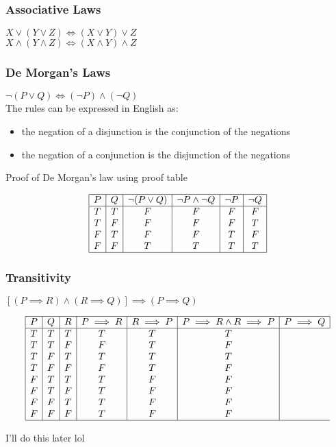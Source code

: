 \documentclass[a4paper]{article}
\begin{document}
\subsubsection{Associative Laws}
$X \lor (Y \lor Z) \Leftrightarrow (X \lor Y) \lor Z $\\
$X \land (Y \land Z) \Leftrightarrow (X \land Y) \land Z $

\subsubsection{De Morgan's Laws}
$\lnot (P \lor Q) \Leftrightarrow (\lnot P) \land (\lnot Q)$
\\
The rules can be expressed in English as:
\begin{itemize}
	\item the negation of a disjunction is the conjunction of the negations
	\item the negation of a conjunction is the disjunction of the negations
\end{itemize}
Proof of De Morgan's law using proof table
\begin{center}
	\begin{displaymath}
		\begin{array}{|c|c|c|c|c|c|c|}
			\hline
			P & Q & \lnot (P \lor Q) & \lnot P \land \lnot Q & \lnot P & \lnot Q\\ 
			\hline
			T & T & F & F & F & F\\
			T & F & F & F & F & T\\
			F & T & F & F & T & F\\
			F & F & T & T & T & T\\
			\hline
		\end{array}
	\end{displaymath}
\end{center}

\subsubsection{Transitivity}
$[(P \implies R) \land (R \implies Q)] \implies (P \implies Q)$

\begin{center}
	\begin{displaymath}
		\begin{array}{|c|c|c|c|c|c|c|}
			\hline
			P & Q & R & P \implies R & R \implies P & P \implies R \land R \implies P & P \implies Q \\ 
			\hline
			T & T & T & T & T & T\\
			T & T & F & F & T & F\\
			T & F & T & T & T & T\\
			T & F & F & F & T & F\\
			F & T & T & T & F & F\\
			F & T & F & T & F & F\\
			F & F & T & T & F & F\\
			F & F & F & T & F & F\\
			\hline
		\end{array}
	\end{displaymath}
\end{center}
I'll do this later lol
\end{document}
